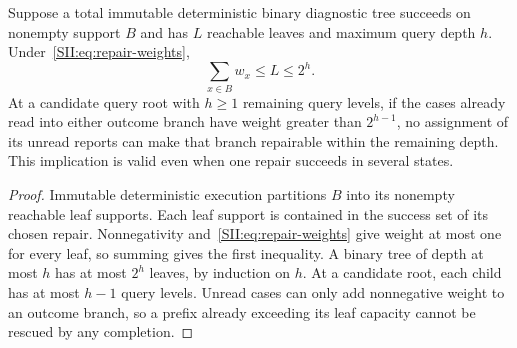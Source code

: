 \begin{SIIproposition}\label{SII:prop:weighted-cover}
Suppose a total immutable deterministic binary diagnostic tree succeeds on nonempty support $B$ and has $L$ reachable leaves and maximum query depth $h$. Under~\eqref{SII:eq:repair-weights},
\[
 \sum_{x\in B}w_x\le L\le2^h.
\]
At a candidate query root with $h\ge1$ remaining query levels, if the cases already read into either outcome branch have weight greater than $2^{h-1}$, no assignment of its unread reports can make that branch repairable within the remaining depth. This implication is valid even when one repair succeeds in several states.
\end{SIIproposition}
\begin{proof}
Immutable deterministic execution partitions $B$ into its nonempty reachable leaf supports. Each leaf support is contained in the success set of its chosen repair. Nonnegativity and~\eqref{SII:eq:repair-weights} give weight at most one for every leaf, so summing gives the first inequality. A binary tree of depth at most $h$ has at most $2^h$ leaves, by induction on $h$. At a candidate root, each child has at most $h-1$ query levels. Unread cases can only add nonnegative weight to an outcome branch, so a prefix already exceeding its leaf capacity cannot be rescued by any completion.
\end{proof}

